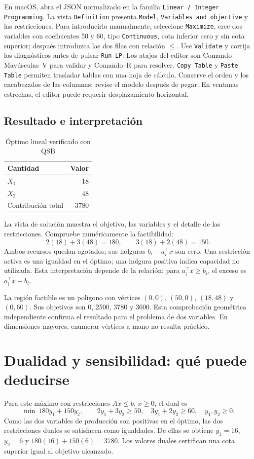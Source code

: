 En macOS, abra el JSON normalizado en la familia
\texttt{Linear / Integer Programming}. La vista \texttt{Definition} presenta
\texttt{Model}, \texttt{Variables and objective} y las restricciones. Para
introducirlo manualmente, seleccione \texttt{Maximize}, cree dos variables con
coeficientes 50 y 60, tipo \texttt{Continuous}, cota inferior cero y sin cota
superior; después introduzca las dos filas con relación \(\leq\). Use
\texttt{Validate} y corrija los diagnósticos antes de pulsar \texttt{Run LP}.
Los atajos del editor son Comando--Mayúsculas--V para validar y Comando--R para
resolver. \texttt{Copy Table} y \texttt{Paste Table} permiten trasladar tablas
con una hoja de cálculo. Conserve el orden y los encabezados de las columnas;
revise el modelo después de pegar. En ventanas estrechas, el editor puede
requerir desplazamiento horizontal.

\subsection{Resultado e interpretación}
\begin{table}[htbp]
\centering
\caption{Óptimo lineal verificado con QSB}
\begin{tabular}{lr}
\toprule
Cantidad & Valor \\
\midrule
\(X_1\) & 18 \\
\(X_2\) & 48 \\
Contribución total & 3780 \\
\bottomrule
\end{tabular}
\end{table}
La vista de solución muestra el objetivo, las variables y el detalle de las
restricciones. Compruebe numéricamente la factibilidad:
\[
 2(18)+3(48)=180,\qquad3(18)+2(48)=150.
\]
Ambos recursos quedan agotados; sus holguras \(b_i-a_i^\top x\) son cero.
Una restricción activa es una igualdad en el óptimo; una holgura positiva
indica capacidad no utilizada. Esta interpretación depende de la relación:
para \(a_i^\top x\geq b_i\), el exceso es \(a_i^\top x-b_i\).

La región factible es un polígono con vértices \((0,0)\), \((50,0)\),
\((18,48)\) y \((0,60)\). Sus objetivos son 0, 2500, 3780 y 3600.
Esta comprobación geométrica independiente confirma el resultado para el
problema de dos variables. En dimensiones mayores, enumerar vértices a mano
no resulta práctico.

\section{Dualidad y sensibilidad: qué puede deducirse}
Para este máximo con restricciones \(Ax\leq b\), \(x\geq0\), el dual es
\[
 \min\ 180y_1+150y_2,\qquad
 2y_1+3y_2\geq50,\quad3y_1+2y_2\geq60,\quad y_1,y_2\geq0.
\]
Como las dos variables de producción son positivas en el óptimo, las dos
restricciones duales se satisfacen como igualdades. De ellas se obtiene
\(y_1=16\), \(y_2=6\) y \(180(16)+150(6)=3780\). Los valores duales
certifican una cota superior igual al objetivo alcanzado.

